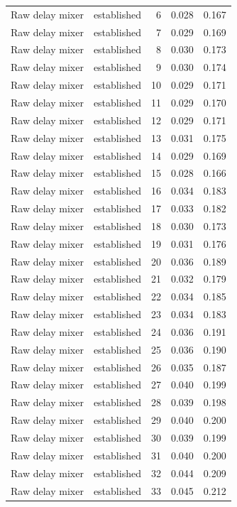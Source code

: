 \begin{tabular}{llrrr}
Raw delay mixer & established & 6 & 0.028 & 0.167 \\
Raw delay mixer & established & 7 & 0.029 & 0.169 \\
Raw delay mixer & established & 8 & 0.030 & 0.173 \\
Raw delay mixer & established & 9 & 0.030 & 0.174 \\
Raw delay mixer & established & 10 & 0.029 & 0.171 \\
Raw delay mixer & established & 11 & 0.029 & 0.170 \\
Raw delay mixer & established & 12 & 0.029 & 0.171 \\
Raw delay mixer & established & 13 & 0.031 & 0.175 \\
Raw delay mixer & established & 14 & 0.029 & 0.169 \\
Raw delay mixer & established & 15 & 0.028 & 0.166 \\
Raw delay mixer & established & 16 & 0.034 & 0.183 \\
Raw delay mixer & established & 17 & 0.033 & 0.182 \\
Raw delay mixer & established & 18 & 0.030 & 0.173 \\
Raw delay mixer & established & 19 & 0.031 & 0.176 \\
Raw delay mixer & established & 20 & 0.036 & 0.189 \\
Raw delay mixer & established & 21 & 0.032 & 0.179 \\
Raw delay mixer & established & 22 & 0.034 & 0.185 \\
Raw delay mixer & established & 23 & 0.034 & 0.183 \\
Raw delay mixer & established & 24 & 0.036 & 0.191 \\
Raw delay mixer & established & 25 & 0.036 & 0.190 \\
Raw delay mixer & established & 26 & 0.035 & 0.187 \\
Raw delay mixer & established & 27 & 0.040 & 0.199 \\
Raw delay mixer & established & 28 & 0.039 & 0.198 \\
Raw delay mixer & established & 29 & 0.040 & 0.200 \\
Raw delay mixer & established & 30 & 0.039 & 0.199 \\
Raw delay mixer & established & 31 & 0.040 & 0.200 \\
Raw delay mixer & established & 32 & 0.044 & 0.209 \\
Raw delay mixer & established & 33 & 0.045 & 0.212 \\

\end{tabular}
